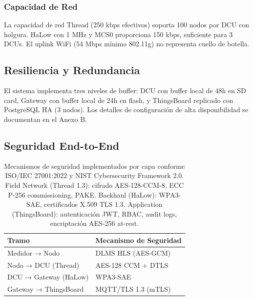 \subsubsection{Capacidad de Red}

La capacidad de red Thread (250 kbps efectivos) soporta 100 nodos por DCU con holgura. HaLow con 1 MHz y MCS0 proporciona 150 kbps, suficiente para 3 DCUs. El uplink WiFi (54 Mbps mínimo 802.11g) no representa cuello de botella.

\subsection{Resiliencia y Redundancia}

El sistema implementa tres niveles de buffer: DCU con buffer local de 48h en SD card, Gateway con buffer local de 24h en flash, y ThingsBoard replicado con PostgreSQL HA (3 nodos). Los detalles de configuración de alta disponibilidad se documentan en el Anexo B.

\subsection{Seguridad End-to-End}

\begin{table}[h]
\centering
\begin{tabular}{|l|l|}
\hline
\textbf{Tramo} & \textbf{Mecanismo de Seguridad} \\
\hline
Medidor → Nodo & DLMS HLS (AES-GCM) \\
Nodo → DCU (Thread) & AES-128 CCM + DTLS \\
DCU → Gateway (HaLow) & WPA3-SAE \\
Gateway → ThingsBoard & MQTT/TLS 1.3 (mTLS) \\
\hline
\end{tabular}
\caption{Mecanismos de seguridad implementados por capa conforme ISO/IEC 27001:2022 y NIST Cybersecurity Framework 2.0. Field Network (Thread 1.3): cifrado AES-128-CCM-8, ECC P-256 commissioning, PAKE. Backhaul (HaLow): WPA3-SAE, certificados X.509 TLS 1.3. Application (ThingsBoard): autenticación JWT, RBAC, audit logs, encriptación AES-256 at-rest.}
\label{tab:security-by-layer}
\end{table}

